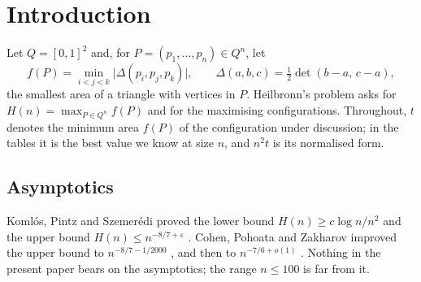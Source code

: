 \documentclass[11pt]{amsart}
\theoremstyle{definition}
\newcommand{\sq}{[0,1]^2}
\begin{document}
\maketitle

\section{Introduction}\label{sec:intro}

Let $Q = \sq$ and, for $P = (p_1,\dots,p_n) \in Q^n$, let
\[
  f(P) = \min_{i<j<k} \lvert\Delta(p_i,p_j,p_k)\rvert, \qquad \Delta(a,b,c) = \tfrac12 \det(b-a,\, c-a),
\]
the smallest area of a triangle with vertices in $P$. Heilbronn's problem asks for $H(n) = \max_{P \in Q^n} f(P)$ and for the maximising configurations. Throughout, $t$ denotes the minimum area $f(P)$ of the configuration under discussion; in the tables it is the best value we know at size $n$, and $n^2t$ is its normalised form.

\subsection*{Asymptotics}
Koml\'os, Pintz and Szemer\'edi proved the lower bound $H(n) \ge c \log n / n^2$ \cite{KPS82} and the upper bound $H(n) \le n^{-8/7+\varepsilon}$ \cite{KPS81}.
Cohen, Pohoata and Zakharov improved the upper bound to $n^{-8/7-1/2000}$ \cite{CPZ23}, and then to $n^{-7/6+o(1)}$ \cite{CPZ24}. %
Nothing in the present paper bears on the asymptotics; the range $n \le 100$ is far from it.
\end{document}
